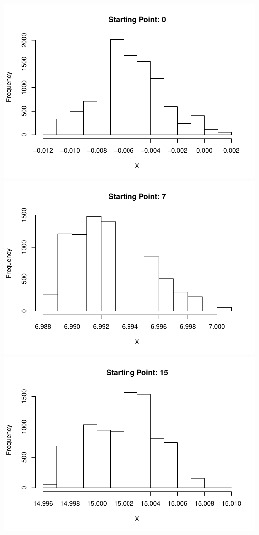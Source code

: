 \documentclass[]{article}
\begin{document}
\includegraphics{Atlas-PS_5_files/figure-latex/unnamed-chunk-5-1.pdf}
\includegraphics{Atlas-PS_5_files/figure-latex/unnamed-chunk-5-2.pdf}
\includegraphics{Atlas-PS_5_files/figure-latex/unnamed-chunk-5-3.pdf}
\end{document}
